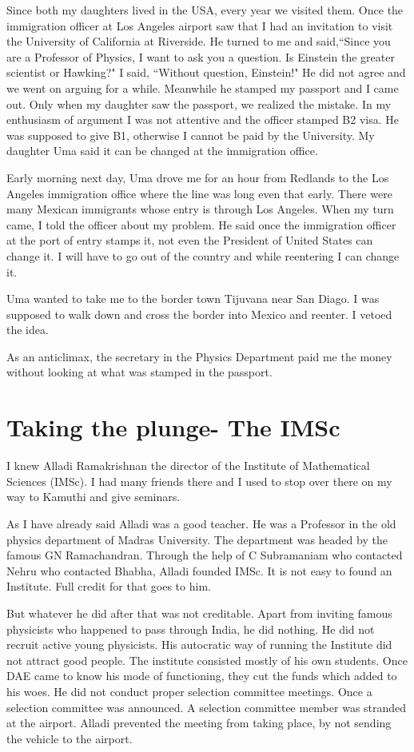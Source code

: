 Since both my daughters lived in the USA, every year we visited them. 
Once the immigration officer at Los Angeles airport saw that I had an 
invitation to visit the University of California at Riverside. He turned 
to me and said,``Since you are a Professor of Physics, I want to ask you 
a question. Is Einstein the greater scientist or Hawking?" I 
said, ``Without question, Einstein!" He did not agree and we went on 
arguing for a while. Meanwhile he stamped my passport and I came out. 
Only when my daughter saw the passport, we realized the mistake. In my 
enthusiasm of argument I was not attentive and the officer stamped B2 
visa. He was supposed to give B1, otherwise I cannot be paid by the 
University. My daughter Uma said it can be changed at the immigration 
office.

Early morning next day, Uma drove me for an hour from Redlands to the 
Los Angeles immigration office where the line was long even that early. 
There were many Mexican immigrants whose entry is through Los Angeles. 
When my turn came, I told the officer about my problem. He said once the 
immigration officer at the port of entry stamps it, not even the 
President of United States can change it. I will have to go out of the 
country and while reentering I can change it.

Uma wanted to take me to the border town Tijuvana near San Diago. I was 
supposed to walk down and cross the border into Mexico and reenter. I 
vetoed the idea.

As an anticlimax, the secretary in the Physics Department paid me the 
money without looking at what was stamped in the passport.
      
\chapter{Taking the plunge- The IMSc}

I knew Alladi Ramakrishnan the director of the Institute of Mathematical 
Sciences (IMSc). I had many friends there and I used to stop over there 
on my way to Kamuthi and give seminars.


As I have already said Alladi was a good teacher. He was a Professor in 
the old physics department of Madras University. The department was 
headed by the famous GN Ramachandran. Through the help of C Subramaniam 
who contacted Nehru who contacted Bhabha, Alladi founded IMSc. It is not 
easy to found an Institute. Full credit for that goes to him.


But whatever he did after that was not creditable. Apart from inviting 
famous physicists who happened to pass through India, he did nothing. He 
did not recruit active young physicists. His autocratic way of running 
the Institute did not attract good people. The institute consisted 
mostly of his own students. Once DAE came to know his mode of 
functioning, they cut the funds which added to his woes. He did not 
conduct proper selection committee meetings. Once a selection committee 
was announced. A selection committee member was stranded at the airport. 
Alladi prevented the meeting from taking place, by not sending the 
vehicle to the airport.

